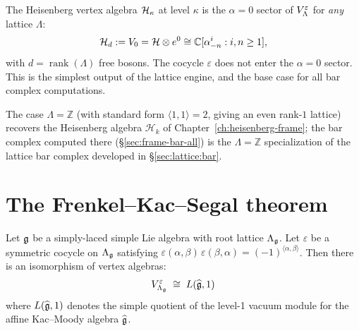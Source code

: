\begin{example}
\label{ex:lattice:heisenberg}
The Heisenberg vertex algebra $\mathcal{H}_\kappa$ at level $\kappa$ is the
$\alpha = 0$ sector of $V_\Lambda^\varepsilon$ for
\emph{any} lattice $\Lambda$:
\[
\mathcal{H}_d := V_0 = \mathcal{H} \otimes e^0 \cong \mathbb{C}[\alpha^i_{-n} : i, n \geq 1],
\]
with $d = \operatorname{rank}(\Lambda)$ free bosons. The cocycle
$\varepsilon$ does not enter the $\alpha = 0$ sector. This is the
simplest output of the lattice engine, and the base case for all
bar complex computations.
\end{example}

\begin{remark}\label{rem:lattice-heisenberg-frame}
The case $\Lambda = \mathbb{Z}$ (with standard form $\langle 1, 1 \rangle = 2$, giving an even rank-$1$ lattice) recovers the Heisenberg algebra $\mathcal{H}_k$ of Chapter~\ref{ch:heisenberg-frame}; the bar complex computed there (\S\ref{sec:frame-bar-all}) is the $\Lambda = \mathbb{Z}$ specialization of the lattice bar complex developed in \S\ref{sec:lattice:bar}.
\end{remark}


\section{The Frenkel--Kac--Segal theorem}
\label{sec:lattice:frenkel-kac}

\begin{theorem}\label{thm:lattice:frenkel-kac}
Let $\mathfrak{g}$ be a simply-laced simple Lie algebra with root lattice
$\Lambda_{\mathfrak{g}}$. Let $\varepsilon$ be a symmetric cocycle on $\Lambda_{\mathfrak{g}}$
satisfying $\varepsilon(\alpha,\beta)\,\varepsilon(\beta,\alpha) =
(-1)^{\langle\alpha,\beta\rangle}$. Then there is an isomorphism of
vertex algebras:
\begin{equation}\label{eq:lattice:frenkel-kac}
V_{\Lambda_{\mathfrak{g}}}^\varepsilon
\;\cong\; L(\widehat{\mathfrak{g}}, 1)
\end{equation}
where $L(\widehat{\mathfrak{g}}, 1)$ denotes the simple quotient of the level-1
vacuum module for the affine Kac--Moody algebra $\widehat{\mathfrak{g}}$.
\end{theorem}

